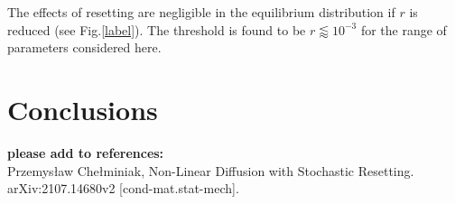 \documentclass[a4paper,12pt,reqno,superscriptaddress,nofootinbib]{article}
\theoremstyle{plain}
\theoremstyle{definition}
\theoremstyle{remark}
\newcommand{\0}{^{(0)}}
\newcommand{\1}{^{(1)}}
\newcommand{\2}{^{(2)}}
\begin{document}
The effects of resetting are negligible in the equilibrium distribution if $r$ is reduced (see Fig.\ref{label}). The threshold is found to be $r\lessapprox 10^{-3}$ for the range of parameters considered here.




\section {Conclusions}\label{con}


\textbf{please add to references:}\\
Przemysław Chełminiak, Non-Linear Diffusion with Stochastic Resetting.  arXiv:2107.14680v2 [cond-mat.stat-mech].




\end{document}
